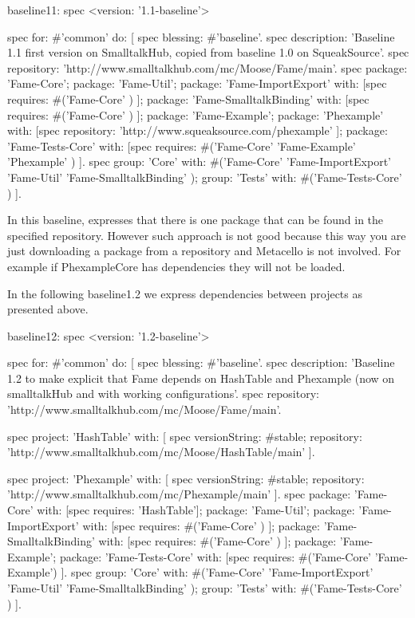 \documentclass[a4paper,10pt,twoside]{book}
\begin{document}
\begin{code}{}
baseline11: spec
	<version: '1.1-baseline'>

	spec for: #'common' do: [
		spec blessing: #'baseline'.
		spec description: 'Baseline 1.1 first version on SmalltalkHub, copied from baseline 1.0 on SqueakSource'.
		spec repository: 'http://www.smalltalkhub.com/mc/Moose/Fame/main'.
		spec 
			package: 'Fame-Core';
			package: 'Fame-Util';
			package: 'Fame-ImportExport' with: [spec requires: #('Fame-Core' ) ];
			package: 'Fame-SmalltalkBinding' with: [spec requires: #('Fame-Core' ) ];
			package: 'Fame-Example';
			package: 'Phexample' with: [spec repository: 'http://www.squeaksource.com/phexample' ];
			package: 'Fame-Tests-Core' with: [spec requires: #('Fame-Core' 'Fame-Example' 'Phexample' ) ].
		spec 
			group: 'Core' with: #('Fame-Core' 'Fame-ImportExport' 'Fame-Util' 'Fame-SmalltalkBinding' );
			group: 'Tests' with: #('Fame-Tests-Core' ) ].
\end{code}

In this baseline, 
expresses that there is one package that can be found in the specified repository.
However such approach is not good because this way you are just downloading a package from a repository and Metacello is not involved. For example if PhexampleCore has dependencies they will not be loaded.

In the following baseline1.2 we express dependencies between projects as presented above.
\begin{code}{}
baseline12: spec
	<version: '1.2-baseline'>

	spec for: #'common' do: [
		spec blessing: #'baseline'.
		spec description: 'Baseline 1.2 to make explicit that Fame depends on HashTable and Phexample (now on smalltalkHub and with working configurations'.
		spec repository: 'http://www.smalltalkhub.com/mc/Moose/Fame/main'.
		
		spec project: 'HashTable' with: [
				spec
					versionString: #stable;
					repository: 'http://www.smalltalkhub.com/mc/Moose/HashTable/main' ].
				
		spec project: 'Phexample' with: [
				spec
					versionString: #stable;
					repository: 'http://www.smalltalkhub.com/mc/Phexample/main' ].		
		spec 
			package: 'Fame-Core' with: [spec requires: 'HashTable'];
			package: 'Fame-Util';
			package: 'Fame-ImportExport' with: [spec requires: #('Fame-Core' ) ];
			package: 'Fame-SmalltalkBinding' with: [spec requires: #('Fame-Core' ) ];
			package: 'Fame-Example';
			package: 'Fame-Tests-Core' with: [spec requires: #('Fame-Core' 'Fame-Example') ].
		spec 
			group: 'Core' with: #('Fame-Core' 'Fame-ImportExport' 'Fame-Util' 'Fame-SmalltalkBinding' );
			group: 'Tests' with: #('Fame-Tests-Core' ) ].
\end{code}
\end{document}
